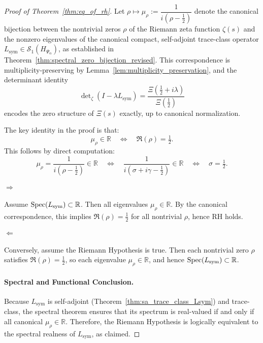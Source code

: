 \begin{proof}[Proof of Theorem~\ref{thm:eq_of_rh}]
Let \( \rho \mapsto \mu_\rho := \dfrac{1}{i(\rho - \tfrac{1}{2})} \) denote the canonical bijection between the nontrivial zeros \( \rho \) of the Riemann zeta function \( \zeta(s) \) and the nonzero eigenvalues of the canonical compact, self-adjoint trace-class operator \( L_{\mathrm{sym}} \in \mathcal{S}_1(H_{\Psi_\alpha}) \), as established in Theorem~\ref{thm:spectral_zero_bijection_revised}. This correspondence is multiplicity-preserving by Lemma~\ref{lem:multiplicity_preservation}, and the determinant identity
\[
\det\nolimits_\zeta(I - \lambda L_{\mathrm{sym}}) = \frac{\Xi\left(\tfrac{1}{2} + i\lambda\right)}{\Xi\left(\tfrac{1}{2}\right)}
\]
encodes the zero structure of \( \Xi(s) \) exactly, up to canonical normalization.

The key identity in the proof is that:
\[
\mu_\rho \in \mathbb{R}
\quad \Longleftrightarrow \quad
\Re(\rho) = \tfrac{1}{2}.
\]
This follows by direct computation:
\[
\mu_\rho = \frac{1}{i(\rho - \tfrac{1}{2})} \in \mathbb{R}
\quad \Longleftrightarrow \quad
\frac{1}{i(\sigma + i\gamma - \tfrac{1}{2})} \in \mathbb{R}
\quad \Longleftrightarrow \quad
\sigma = \tfrac{1}{2}.
\]

\paragraph{\( \Rightarrow \)}  
Assume \( \operatorname{Spec}(L_{\mathrm{sym}}) \subset \mathbb{R} \). Then all eigenvalues \( \mu_\rho \in \mathbb{R} \). By the canonical correspondence, this implies \( \Re(\rho) = \tfrac{1}{2} \) for all nontrivial \( \rho \), hence RH holds.

\paragraph{\( \Leftarrow \)}  
Conversely, assume the Riemann Hypothesis is true. Then each nontrivial zero \( \rho \) satisfies \( \Re(\rho) = \tfrac{1}{2} \), so each eigenvalue \( \mu_\rho \in \mathbb{R} \), and hence \( \operatorname{Spec}(L_{\mathrm{sym}}) \subset \mathbb{R} \).

\paragraph{Spectral and Functional Conclusion.}
Because \( L_{\mathrm{sym}} \) is self-adjoint (Theorem~\ref{thm:sa_trace_class_Lsym}) and trace-class, the spectral theorem ensures that its spectrum is real-valued if and only if all canonical \( \mu_\rho \in \mathbb{R} \). Therefore, the Riemann Hypothesis is logically equivalent to the spectral realness of \( L_{\mathrm{sym}} \), as claimed.
\end{proof}
%  